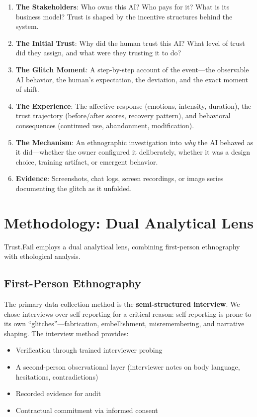 \documentclass[11pt,a4paper]{article}
\begin{document}
\begin{enumerate}[noitemsep]
    \item \textbf{The Stakeholders}: Who owns this AI? Who pays for it? What is its business model? Trust is shaped by the incentive structures behind the system.
    \item \textbf{The Initial Trust}: Why did the human trust this AI? What level of trust did they assign, and what were they trusting it to do?
    \item \textbf{The Glitch Moment}: A step-by-step account of the event---the observable AI behavior, the human's expectation, the deviation, and the exact moment of shift.
    \item \textbf{The Experience}: The affective response (emotions, intensity, duration), the trust trajectory (before/after scores, recovery pattern), and behavioral consequences (continued use, abandonment, modification).
    \item \textbf{The Mechanism}: An ethnographic investigation into \textit{why} the AI behaved as it did---whether the owner configured it deliberately, whether it was a design choice, training artifact, or emergent behavior.
    \item \textbf{Evidence}: Screenshots, chat logs, screen recordings, or image series documenting the glitch as it unfolded.
\end{enumerate}

\section{Methodology: Dual Analytical Lens}

Trust.Fail employs a dual analytical lens, combining first-person ethnography with ethological analysis.

\subsection{First-Person Ethnography}

The primary data collection method is the \textbf{semi-structured interview}. We chose interviews over self-reporting for a critical reason: self-reporting is prone to its own ``glitches''---fabrication, embellishment, misremembering, and narrative shaping. The interview method provides:

\begin{itemize}[noitemsep]
    \item Verification through trained interviewer probing
    \item A second-person observational layer (interviewer notes on body language, hesitations, contradictions)
    \item Recorded evidence for audit
    \item Contractual commitment via informed consent
\end{itemize}
\end{document}
